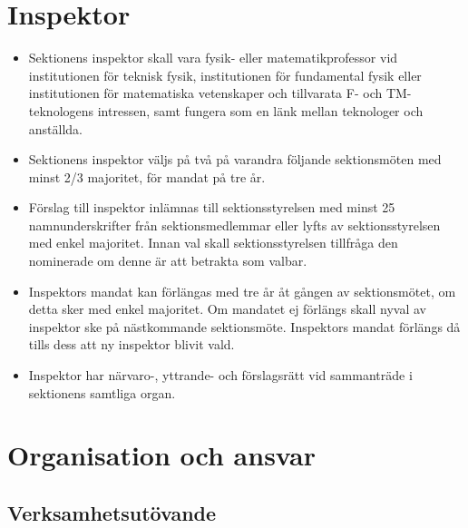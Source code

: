 \documentclass[11pt,a4paper]{article}
\begin{document}
\newpage

\section{Inspektor}

\begin{itemize}

	\item Sektionens inspektor skall vara fysik- eller matematikprofessor vid institutionen för teknisk fysik, institutionen för fundamental fysik eller institutionen för matematiska vetenskaper och tillvarata F- och TM-teknologens intressen, samt fungera som en länk mellan teknologer och anställda.
	
	\item Sektionens inspektor väljs på två på varandra följande sektionsmöten med minst 2/3 majoritet, för mandat på tre år. 
	
	\item Förslag till inspektor inlämnas till sektionsstyrelsen med minst 25 namnunderskrifter från sektionsmedlemmar eller lyfts av sektionsstyrelsen med enkel majoritet. Innan val skall sektionsstyrelsen tillfråga den nominerade om denne är att betrakta som valbar.
	
	\item Inspektors mandat kan förlängas med tre år åt gången av sektionsmötet, om detta sker med enkel majoritet. Om mandatet ej förlängs skall nyval av inspektor ske på nästkommande sektionsmöte. Inspektors mandat förlängs då tills dess att ny inspektor blivit vald.


\item Inspektor har närvaro-, yttrande- och förslagsrätt vid sammanträde i sektionens samtliga organ.

\end{itemize}


\section{Organisation och ansvar}

\subsection{Verksamhetsutövande}
\end{document}
